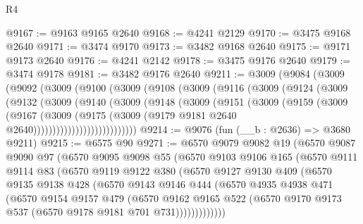 \begin{lexlean}{R4}
\begin{coremodule}
@9167 := @9163 @9165 @2640
@9168 := @4241 @2129
@9170 := @3475 @9168 @2640
@9171 := @3474 @9170
@9173 := @3482 @9168 @2640
@9175 := @9171 @9173 @2640
@9176 := @4241 @2142
@9178 := @3475 @9176 @2640
@9179 := @3474 @9178
@9181 := @3482 @9176 @2640
@9211 := @3009
    (@9084
      (@3009
        (@9092
          (@3009
            (@9100
              (@3009
                (@9108
                  (@3009
                    (@9116
                      (@3009
                        (@9124
                          (@3009
                            (@9132
                              (@3009
                                (@9140
                                  (@3009
                                    (@9148
                                      (@3009
                                        (@9151
                                          (@3009
                                            (@9159
                                              (@3009
                                                (@9167
                                                  (@3009
                                                    (@9175
                                                      (@3009
                                                        (@9179
                                                          @9181
                                                          @2640
                                                          @2640)))))))))))))))))))))))))))
@9214 := @9076 (fun (__b : @2636) => @3680 @9211)
@9215 := @6575 @90
@9271 := @6570
    @9079
    @9082
    @19
    (@6570
      @9087
      @9090
      @97
      (@6570
        @9095
        @9098
        @55
        (@6570
          @9103
          @9106
          @165
          (@6570
            @9111
            @9114
            @83
            (@6570
              @9119
              @9122
              @380
              (@6570
                @9127
                @9130
                @409
                (@6570
                  @9135
                  @9138
                  @428
                  (@6570
                    @9143
                    @9146
                    @444
                    (@6570
                      @4935
                      @4938
                      @471
                      (@6570
                        @9154
                        @9157
                        @479
                        (@6570
                          @9162
                          @9165
                          @522
                          (@6570 @9170 @9173 @537 (@6570 @9178 @9181 @701 @731)))))))))))))

\end{coremodule}
\end{lexlean}
